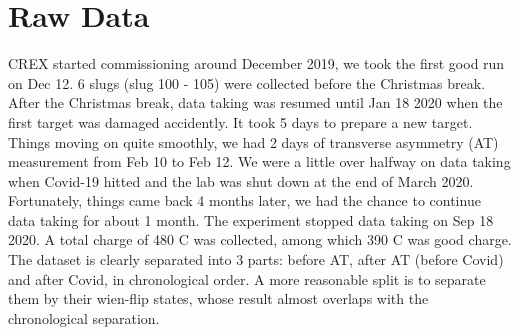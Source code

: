 \begin{comment}
    \begin{itemize}
	\item (design) PREX-II statistical width: $\sim 120\ ppm @30Hz$
	\item (design) BCM resolution: $40\ ppm$
	\item (measured) 1 MHz BCM electronics: $\sim 25\ ppm @30 Hz, 20\ \mu A$
	\item charge and position jitter
	    $$ A_Q: 100-300\ ppm \quad \Delta x: 5-25\ \mu m$$
    \end{itemize}
\end{comment}

\section{Raw Data}
CREX started commissioning around December 2019, we took the first good run on 
Dec 12. 6 slugs (slug 100 - 105) were collected before the Christmas break. After 
the Christmas break, data taking was resumed until Jan 18 2020 when the first \Ca 
target was damaged accidently. It took 5 days to prepare a new \Ca target.
Things moving on quite smoothly, we had 2 days of transverse asymmetry (AT)
measurement from Feb 10 to Feb 12. We were a little over halfway on data taking 
when Covid-19 hitted and the lab was shut down at the end of March 2020. Fortunately,
things came back 4 months later, we had the chance to continue data taking for
about 1 month. The experiment stopped data taking on Sep 18 2020. A total charge
of 480 C was collected, among which 390 C was good charge. The dataset is clearly
separated into 3 parts: before AT, after AT (before Covid) and after Covid, in
chronological order. A more reasonable split is to separate them by their wien-flip
states, whose result almost overlaps with the chronological separation.

